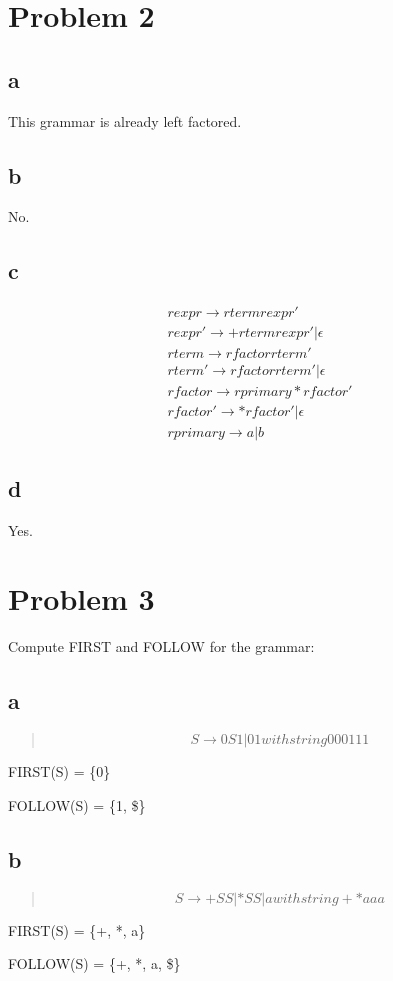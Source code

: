 \documentclass[paper=a4, fontsize=11pt]{scrartcl} %
\numberwithin{equation}{section} %
\numberwithin{figure}{section} %
\numberwithin{table}{section} %
\begin{document}
\newpage
\section*{Problem 2}
\subsection*{a}
	This grammar is already left factored.
\subsection*{b}
	No.
\subsection*{c}
	\begin{eqnarray*}
		rexpr \to rterm rexpr' \\
		rexpr' \to +rterm rexpr' | \epsilon \\
		rterm \to rfactor rterm' \\
		rterm' \to rfactor rterm' | \epsilon \\
 		rfactor \to rprimary *rfactor' \\
		rfactor' \to *rfactor' | \epsilon \\
		rprimary \to a | b
	\end{eqnarray*}
\subsection*{d}
	Yes.

\newpage
\section*{Problem 3}
	Compute FIRST and FOLLOW for the grammar:
\subsection*{a}
	\begin{quote}
		\begin{displaymath}
			S \to 0S1 | 01withstring000111
		\end{displaymath}
	\end{quote}
	FIRST(S) = \{0\}
	
	FOLLOW(S) = \{1, \$\}
\subsection*{b}
	\begin{quote}
		\begin{displaymath}
			S \to +SS | *SS | awithstring+*aaa
		\end{displaymath}
	\end{quote}
	
	FIRST(S) = \{+, *, a\}
	
	FOLLOW(S) = \{+, *, a, \$\}
\end{document}
